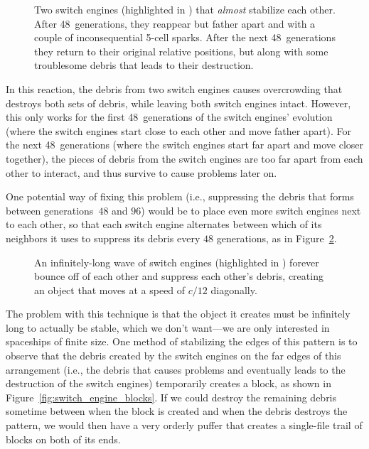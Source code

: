 \begin{figure}[!htb]
	\centering{}
	\caption{Two switch engines (highlighted in ) that \emph{almost} stabilize each other. After 48~generations, they reappear but father apart and with a couple of inconsequential 5-cell sparks. After the next 48~generations they return to their original relative positions, but along with some troublesome debris that leads to their destruction.}\label{fig:switch_engine_48}
\end{figure}

In this reaction, the debris from two switch engines causes overcrowding that destroys both sets of debris, while leaving both switch engines intact. However, this only works for the first 48~generations of the switch engines' evolution (where the switch engines start close to each other and move father apart). For the next 48~generations (where the switch engines start far apart and move closer together), the pieces of debris from the switch engines are too far apart from each other to interact, and thus survive to cause problems later on.

One potential way of fixing this problem (i.e., suppressing the debris that forms between generations~$48$ and $96$) would be to place even more switch engines next to each other, so that each switch engine alternates between which of its neighbors it uses to suppress its debris every $48$ generations, as in Figure~\ref{fig:switch_engine_infinite}.

\begin{figure}[!htb]
	\centering{}
	\caption{An infinitely-long wave of switch engines (highlighted in ) forever bounce off of each other and suppress each other's debris, creating an object that moves at a speed of $c/12$ diagonally.}\label{fig:switch_engine_infinite}
\end{figure}

The problem with this technique is that the object it creates must be infinitely long to actually be stable, which we don't want---we are only interested in spaceships of finite size. One method of stabilizing the edges of this pattern is to observe that the debris created by the switch engines on the far edges of this arrangement (i.e., the debris that causes problems and eventually leads to the destruction of the switch engines) temporarily creates a block, as shown in Figure~\ref{fig:switch_engine_blocks}. If we could destroy the remaining debris sometime between when the block is created and when the debris destroys the pattern, we would then have a very orderly puffer that creates a single-file trail of blocks on both of its ends.

